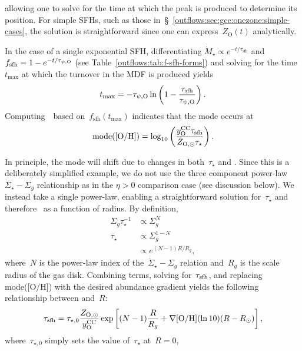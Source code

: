 allowing one to solve for the time at which the peak is produced to determine
its position.
For simple SFHs, such as those in~\S~\ref{outflows:sec:gce:onezone:simple-cases},
the solution is straightforward since one can express~$Z_\text{O}(t)$
analytically.
\par
In the case of a single exponential SFH, differentiating
$\dot{M}_\star \propto e^{-t / \tau_\text{sfh}}$ and
$f_\text{sfh} = 1 - e^{-t / \tau_{\psi,\text{O}}}$ (see
Table~\ref{outflows:tab:f-sfh-forms}) and solving for the time~$t_\text{max}$
at which the turnover in the MDF is produced yields
\begin{equation}
t_\text{max} = -\tau_{\psi,\text{O}} \ln \left(1 - \frac{\tau_\text{sfh}}{\tau_{\psi,\text{O}}}
\right).
\end{equation}
Computing~\oh~based on~$f_\text{sfh}(t_\text{max})$ indicates that the mode
occurs at
\begin{equation}
\text{mode([O/H])} = \log_{10}
\left(\frac{y_\text{O}^\text{CC} \tau_\text{sfh}}{Z_{\text{O},\odot} \tau_\star}\right).
\end{equation}
\par
In principle, the mode will shift due to changes in both~$\tau_\star$ and
.
Since this is a deliberately simplified example, we do not use the three
component power-law~$\dot{\Sigma}_\star - \Sigma_g$ relationship as in the
$\eta > 0$ comparison case (see discussion below).
We instead take a single power-law, enabling a straightforward solution
for~$\tau_\star$ and therefore~ as a function of radius.
By definition,
\begin{equation}
\begin{split}
\Sigma_g \tau_\star^{-1} &\propto \Sigma_g^N
\\
\tau_\star & \propto \Sigma_g^{1 - N}
\\
& \propto e^{(N - 1) R / R_g},
\end{split}
\end{equation}
where~$N$ is the power-law index of the~$\dot{\Sigma}_\star - \Sigma_g$
relation and~$R_g$ is the scale radius of the gas disk.
Combining terms, solving for~$\tau_\text{sfh}$, and replacing mode([O/H]) with
the desired abundance gradient yields the following relationship between
 and~$R$:
\begin{equation}
\tau_\text{sfh} = \tau_{\star,0} \frac{Z_{\text{O},\odot}}{y_\text{O}^\text{CC}}
\exp\left[
(N - 1)\frac{R}{R_g} + \nabla\text{[O/H]}(\ln 10)(R - R_\odot)
\right],
\label{outflows:eq:tausfh-simplified}
\end{equation}
where~$\tau_{\star,0}$ simply sets the value of~$\tau_\star$ at~$R = 0$,
